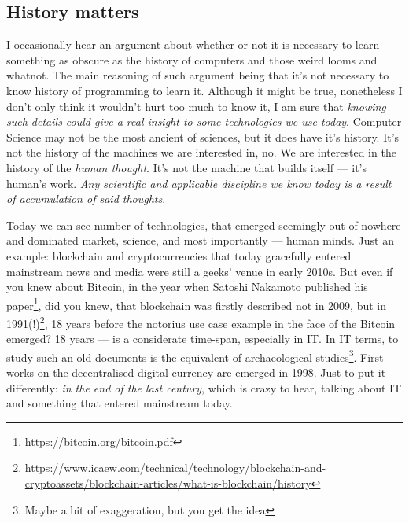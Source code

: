 \documentclass[../../what-is-computer]{subfiles}
\begin{document}
    \subsection{History matters}

    I occasionally hear an argument about whether or not it is necessary to learn something as obscure as the history of computers and those weird looms and whatnot. The main
    reasoning of such argument being that it's not necessary to know history of programming to learn it. Although it might be true, nonetheless I don't only think it 
    wouldn't hurt too much to know it, I am sure that \emph{knowing such details could give a real insight to some technologies we use today}. Computer Science
    may not be the most ancient of sciences, but it does have it's history. It's not the history of the machines we are interested in, no. We are interested in 
    the history of the \emph{human thought}. It's not the machine that builds itself --- it's human's work. \emph{Any scientific and applicable discipline we know today
    is a result of accumulation of said thoughts}. \par

    Today we can see number of technologies, that emerged seemingly out of nowhere and dominated market, science, and 
    most importantly --- human minds. Just an example: blockchain and cryptocurrencies that today gracefully entered mainstream news and media were still a geeks'
    venue in early 2010s. But even if you knew about Bitcoin, in the year when Satoshi Nakamoto published his paper\footnote{\href{https://bitcoin.org/bitcoin.pdf}
    {https://bitcoin.org/bitcoin.pdf}}, did you knew, that blockchain was firstly described not in 2009, but in 
    1991(!)\footnote{\href{https://www.icaew.com/technical/technology/blockchain-and-cryptoassets/blockchain-articles/what-is-blockchain/history}
    {https://www.icaew.com/technical/technology/blockchain-and-cryptoassets/blockchain-articles/what-is-blockchain/history}}, 18 years before the notorius use case example
    in the face of the Bitcoin emerged? 18 years --- is a considerate time-span, especially in IT. In IT terms, to study such an old documents is the equivalent of
    archaeological studies\footnote{Maybe a bit of exaggeration, but you get the idea}. First works on the decentralised digital currency are emerged in 1998. Just to
    put it differently: \emph{in the end of the last century}, which is crazy to hear, talking about IT and something that entered mainstream today. \par
\end{document}
